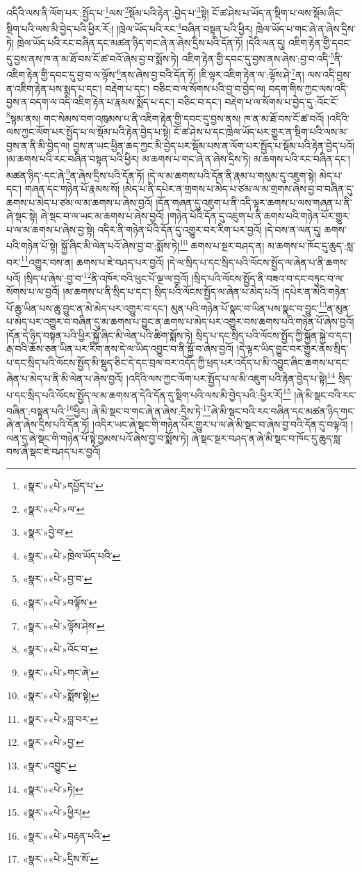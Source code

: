 འདིའི་ལས་ནི་ལོག་པར་:སྤྱོད་པ་\footnote{«སྣར་»«པེ་»དཔྱོད་པ་}ལས་\footnote{«སྣར་»«པེ་»ལ་}སྡོམ་པའི་རྟེན་:བྱེད་པ་\footnote{«སྣར་»བྱེ་བ་}སྟེ། ངོ་ཚ་ཤེས་པ་ཡོད་ན་སྡིག་པ་ལས་སྡོམ་ཞིང་སྡིག་པའི་ལས་མི་བྱེད་པའི་ཕྱིར་རོ:། །ཁྲེལ་ཡོད་པའི་རང་\footnote{«སྣར་»«པེ་»ཁྲེལ་ཡོད་པའི་}བཞིན་བསྟན་པའི་ཕྱིར། ཁྲེལ་ཡོད་པ་གང་ཞེ་ན་ཞེས་དྲིས་ཏེ། ཁྲེལ་ཡོད་པའི་རང་བཞིན་དང་མཚན་ཉིད་གང་ཞེ་ན་ཞེས་དྲིས་པའི་དོན་ཏོ། །དེའི་ལན་དུ། འཇིག་རྟེན་གྱི་དབང་དུ་བྱས་ནས་ཁ་ན་མ་ཐོ་བས་ངོ་ཚ་བའོ་ཞེས་བྱ་བ་སྨོས་ཏེ། འཇིག་རྟེན་གྱི་དབང་དུ་བྱས་ནས་ཞེས་:བྱ་བ་འདི་\footnote{«སྣར་»«པེ་»བྱ་བ་}ནི་འཇིག་རྟེན་གྱི་དབང་དུ་བྱ་བ་ལ་ལྟོས་\footnote{«སྣར་»«པེ་»བལྟོས་}ནས་ཞེས་བྱ་བའི་དོན་ཏོ། །ཇི་ལྟར་འཇིག་རྟེན་ལ་:ལྟོས་ཤེ་\footnote{«སྣར་»«པེ་»ལྟོས་ཤེས་}ན། ལས་འདི་བྱས་ན་འཇིག་རྟེན་པས་སྨད་པ་དང་། བརྡེག་པ་དང་། བཅིང་བ་ལ་སོགས་པའི་བྱ་བ་བྱེད་ལ། བདག་གིས་ཀྱང་ལས་འདི་བྱས་ན་བདག་ལ་འདི་འཇིག་རྟེན་པ་རྣམས་སྨོད་པ་དང་། བཅིང་བ་དང་། བརྡེག་པ་ལ་སོགས་པ་བྱེད་དུ་:འོང་ངོ་\footnote{«སྣར་»«པེ་»འོང་བ་}སྙམ་ནས། གང་སེམས་བག་འཁུམས་པ་ནི་འཇིག་རྟེན་གྱི་དབང་དུ་བྱས་ནས། ཁ་ན་མ་ཐོ་བས་ངོ་ཚ་བའོ། །འདིའི་ལས་ཀྱང་ལོག་པར་སྤྱོད་པ་ལ་སྡོམ་པའི་རྟེན་བྱེད་པ་སྟེ། ངོ་ཚ་ཤེས་པ་དང་ཁྲེལ་ཡོད་པར་གྱུར་ན་སྡིག་པའི་ལས་མ་བྱས་ན་ནི་མི་བྱེད་ལ། བྱས་ན་ཡང་ཕྱིན་ཆད་ཀྱང་མི་བྱེད་པར་སྡོམ་པས་ན་ལོག་པར་སྤྱོད་པ་སྡོམ་པའི་རྟེན་བྱེད་པའོ། །མ་ཆགས་པའི་རང་བཞིན་བསྟན་པའི་ཕྱིར། མ་ཆགས་པ་གང་ཞེ་ན་ཞེས་དྲིས་ཏེ། མ་ཆགས་པའི་རང་བཞིན་དང་། མཚན་ཉིད་:དང་ཞེ་\footnote{«སྣར་»«པེ་»གང་ཞེ་}ན་ཞེས་དྲིས་པའི་དོན་ཏོ། །དེ་ལ་མ་ཆགས་པའི་དོན་ནི་རྣམ་པ་གསུམ་དུ་འཇུག་སྟེ། མེད་པ་དང་། གཞན་དང་གཉེན་པོ་རྣམས་སོ། །མེད་པ་ནི་དཔེར་ན་གྲགས་པ་མེད་པ་ཙམ་ལ་མ་གྲགས་ཞེས་བྱ་བ་བཞིན་དུ་ཆགས་པ་མེད་པ་ཙམ་ལ་མ་ཆགས་པ་ཞེས་བྱའོ། །དོན་གཞན་དུ་འཇུག་པ་ནི་འདི་ལྟར་ཆགས་པ་ལས་གཞན་པ་ནི་ཞེ་སྡང་སྟེ། ཞེ་སྡང་བ་ལ་ཡང་མ་ཆགས་པ་ཞེས་བྱའོ། །གཉེན་པོའི་དོན་དུ་འཇུག་པ་ནི་ཆགས་པའི་གཉེན་པོར་གྱུར་པ་ལ་མ་ཆགས་པ་ཞེས་བྱ་སྟེ། འདིར་ནི་གཉེན་པོའི་དོན་དུ་འགྱུར་བར་རིག་པར་བྱའོ། །དེ་བས་ན་ལན་དུ། ཆགས་པའི་གཉེན་པོ་སྟེ། སྐྱོ་ཞིང་མི་ལེན་པའོ་ཞེས་བྱ་བ་:སྨོས་ཏེ།\footnote{«སྣར་»«པེ་»སྨོས་སྟེ།} ཆགས་པ་སྔར་བཤད་ན། མ་ཆགས་པ་ཁོང་དུ་ཆུད་:སླ་བར་\footnote{«སྣར་»«པེ་»བླ་བར་}འགྱུར་བས་ན། ཆགས་པ་ཇེ་བཤད་པར་བྱའོ། །དེ་ལ་སྲིད་པ་དང་སྲིད་པའི་ལོངས་སྤྱོད་ལ་ཞེན་པ་ནི་ཆགས་པའོ། །སྲིད་པ་ཞེས་:བྱ་བ་\footnote{«སྣར་»«པེ་»བྱ་}ནི་འཁོར་བའི་ཕུང་པོ་ལྔ་ལ་བྱའོ། །སྲིད་པའི་ལོངས་སྤྱོད་ནི་བཟའ་བ་དང་བཏུང་བ་ལ་སོགས་པ་ལ་བྱའོ། །མ་ཆགས་པ་ནི་སྲིད་པ་དང་། སྲིད་པའི་ལོངས་སྤྱོད་ལ་ཞེན་པ་མེད་པའོ། །དཔེར་ན་མེའི་གཉེན་པོ་ཆུ་ཡིན་པས་ཆུ་བྱུང་ན་མེ་མེད་པར་འགྱུར་བ་དང་། མུན་པའི་གཉེན་པོ་སྣང་བ་ཡིན་པས་སྣང་བ་བྱུང་\footnote{«སྣར་»འབྱུང་}ན་མུན་པ་མེད་པར་འགྱུར་བ་བཞིན་དུ་མ་ཆགས་པ་བྱུང་ན་ཆགས་པ་མེད་པར་འགྱུར་བས་ཆགས་པའི་གཉེན་པོ་ཞེས་བྱའོ། །དོན་དེ་ཉིད་བསྟན་པའི་ཕྱིར་སྐྱོ་ཞིང་མི་ལེན་པའི་ཚིག་སྨོས་ཏེ། སྲིད་པ་དང་སྲིད་པའི་ལོངས་སྤྱོད་ཀྱི་སྐྱོན་སྐྱེ་བ་དང་། རྒ་བའི་ཆོས་ཅན་ཡིན་པར་རིག་ནས་དེ་ལ་ཡིད་འབྱུང་བ་ནི་སྐྱོ་བ་ཞེས་བྱའོ། །དེ་ལྟར་ཡིད་བྱུང་བར་གྱུར་ནས་སྲིད་པ་དང་སྲིད་པའི་ལོངས་སྤྱོད་མི་སྡུད་ཅིང་དེ་དང་བྲལ་བར་འདོད་ཀྱི་ཕྲད་པར་འདོད་པ་མི་འབྱུང་ཞིང་ཆགས་པ་དང་ཞེན་པ་མེད་པ་ནི་མི་ལེན་པ་ཞེས་བྱའོ། །འདིའི་ལས་ཀྱང་ལོག་པར་སྤྱོད་པ་ལ་མི་འཇུག་པའི་རྟེན་བྱེད་པ་སྟེ།\footnote{«སྣར་»«པེ་»ཏེ།} སྲིད་པ་དང་སྲིད་པའི་ལོངས་སྤྱོད་ལ་མ་ཆགས་ན་དེའི་དོན་དུ་སྡིག་པའི་ལས་མི་བྱེད་པའི་:ཕྱིར་རོ།\footnote{«སྣར་»«པེ་»ཕྱིར།} །ཞེ་མི་སྡང་བའི་རང་བཞིན་:བསྟན་པའི་\footnote{«སྣར་»«པེ་»བརྟན་པའི་}ཕྱིར། ཞེ་མི་སྡང་བ་གང་ཞེ་ན་ཞེས་:དྲིས་ཏེ་\footnote{«སྣར་»«པེ་»དྲིས་སོ་}ཞེ་མི་སྡང་བའི་རང་བཞིན་དང་མཚན་ཉིད་གང་ཞེ་ན་ཞེས་དྲིས་པའི་དོན་ཏོ། །འདིར་ཡང་ཞེ་སྡང་གི་གཉེན་པོར་གྱུར་པ་ལ་ཞེ་མི་སྡང་བ་ཞེས་བྱ་བའི་དོན་དུ་བལྟའོ། །ལན་དུ་ཞེ་སྡང་གི་གཉེན་པོ་སྟེ་བྱམས་པའོ་ཞེས་བྱ་བ་སྨོས་ཏེ། ཞེ་སྡང་སྔར་བཤད་ན་ཞེ་མི་སྡང་བ་ཁོང་དུ་ཆུད་སླ་བས་ཞེ་སྡང་ཇེ་བཤད་པར་བྱའོ། 
